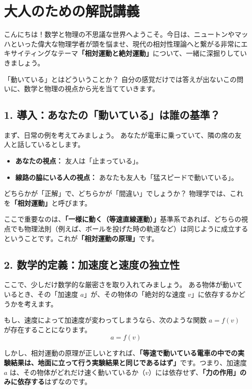 \documentclass[a4paper,11pt,openany]{ltjsbook}
\begin{document}
\section{大人のための解説講義}
\begin{lecturebox}
こんにちは！数学と物理の不思議な世界へようこそ。今日は、ニュートンやマッハといった偉大な物理学者が頭を悩ませ、現代の相対性理論へと繋がる非常にエキサイティングなテーマ\textbf{「相対運動と絶対運動」}について、一緒に深掘りしていきましょう。

「動いている」とはどういうことか？ 自分の感覚だけでは答えが出ないこの問いに、数学と物理の視点から光を当てていきます。

\subsection*{1. 導入：あなたの「動いている」は誰の基準？}

まず、日常の例を考えてみましょう。
あなたが電車に乗っていて、隣の席の友人と話しているとします。
\begin{itemize}[leftmargin=2em]
\item \textbf{あなたの視点：} 友人は「止まっている」。
\item \textbf{線路の脇にいる人の視点：} あなたも友人も「猛スピードで動いている」。
\end{itemize}

どちらかが「正解」で、どちらかが「間違い」でしょうか？ 物理学では、これを\textbf{「相対運動」}と呼びます。

ここで重要なのは、\textbf{「一様に動く（等速直線運動）」}基準系であれば、どちらの視点でも物理法則（例えば、ボールを投げた時の軌道など）は同じように成立するということです。これが\textbf{「相対運動の原理」}です。

\subsection*{2. 数学的定義：加速度と速度の独立性}

ここで、少しだけ数学的な厳密さを取り入れてみましょう。
ある物体が動いているとき、その「加速度 $a$」が、その物体の「絶対的な速度 $v$」に依存するかどうかを考えます。

もし、速度によって加速度が変わってしまうなら、次のような関数 $a = f(v)$ が存在することになります。
$$a = f(v)$$

しかし、相対運動の原理が正しいとすれば、\textbf{「等速で動いている電車の中での実験結果は、地面に立って行う実験結果と同じであるはず」}です。つまり、加速度 $a$ は、その物体がどれだけ速く動いているか（$v$）には依存せず、\textbf{「力の作用」のみに依存する}はずなのです。


\end{lecturebox}
\end{document}
